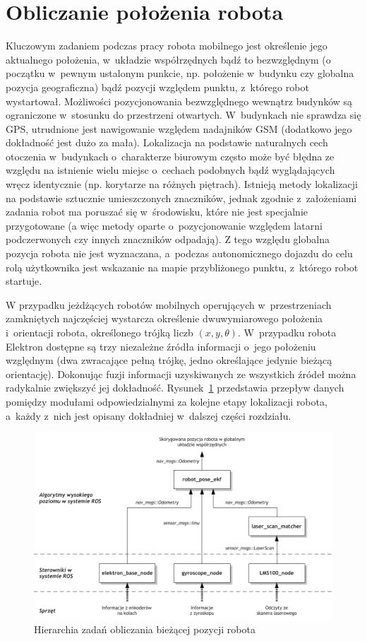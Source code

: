 \section{Obliczanie położenia robota}

Kluczowym zadaniem podczas pracy robota mobilnego jest określenie jego
aktualnego położenia, w~układzie współrzędnych bądź to bezwzględnym (o początku
w~pewnym ustalonym punkcie, np. położenie w~budynku czy globalna pozycja
geograficzna) bądź pozycji względem punktu, z~którego robot wystartował.
Możliwości pozycjonowania bezwzględnego wewnątrz budynków są ograniczone
w~stosunku do przestrzeni otwartych. W~budynkach nie sprawdza się GPS, utrudnione
jest nawigowanie względem nadajników GSM (dodatkowo jego dokładność jest dużo
za mała). Lokalizacja na podstawie naturalnych cech otoczenia w~budynkach
o~charakterze biurowym często może być błędna ze względu na istnienie wielu miejsc
o~cechach podobnych bądź wyglądających wręcz identycznie (np. korytarze na
różnych piętrach). Istnieją metody lokalizacji na podstawie sztucznie
umieszczonych znaczników, jednak zgodnie z~założeniami zadania robot ma poruszać
się w~środowisku, które nie jest specjalnie przygotowane (a więc metody oparte
o~pozycjonowanie względem latarni podczerwonych czy innych znaczników odpadają).
Z tego względu globalna pozycja robota nie jest wyznaczana, a~podczas
autonomicznego dojazdu do celu rolą użytkownika jest wskazanie na mapie
przybliżonego punktu, z~którego robot startuje.

W przypadku jeżdżących robotów mobilnych operujących w~przestrzeniach
zamkniętych najczęściej wystarcza określenie dwuwymiarowego położenia
i~orientacji robota, określonego trójką liczb $(x, y, \theta)$. W~przypadku
robota Elektron dostępne są trzy niezależne źródła informacji o~jego położeniu
względnym (dwa zwracające pełną trójkę, jedno określające jedynie bieżącą
orientację). Dokonując fuzji informacji uzyskiwanych ze wszystkich źródeł można
radykalnie zwiększyć jej dokładność. Rysunek~\ref{fig:diag_pos} przedstawia
przepływ danych pomiędzy modułami odpowiedzialnymi za kolejne etapy lokalizacji
robota, a~każdy z~nich jest opisany dokładniej w~dalszej części rozdziału.

\begin{figure}[h!]
\centering
\includegraphics{../img/diag_position}
\caption{Hierarchia zadań obliczania bieżącej pozycji robota}
\label{fig:diag_pos}
\end{figure}

